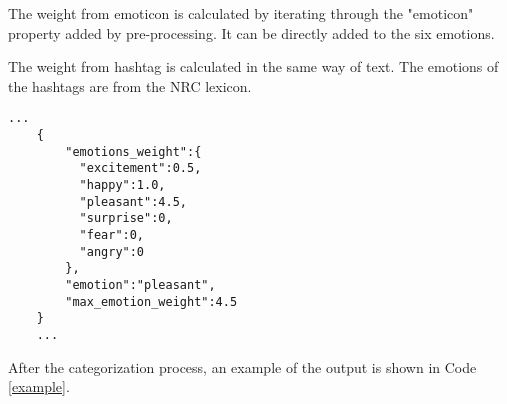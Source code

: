 The weight from emoticon is calculated by iterating through the "emoticon" property added by pre-processing. It can be directly added to the six emotions.

The weight from hashtag is calculated in the same way of text. The emotions of the hashtags are from the NRC lexicon.

\begin{lstlisting}[caption={Tweet Example},captionpos=b,label={example}]
    ...
    {
        "emotions_weight":{
          "excitement":0.5,
          "happy":1.0,
          "pleasant":4.5,
          "surprise":0,
          "fear":0,
          "angry":0
        },
        "emotion":"pleasant",
        "max_emotion_weight":4.5
    }
    ...
\end{lstlisting}

After the categorization process, an example of the output is shown in Code \ref{example}.
